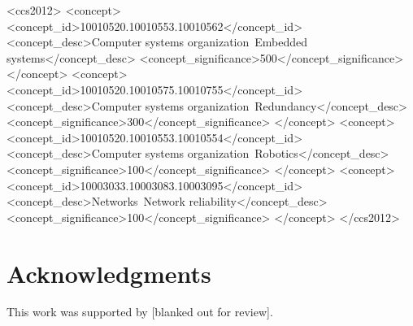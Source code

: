\documentclass[sigchi]{acmart}
\begin{document}
\renewcommand{\shortauthors}{B. Trovato et al.}



%
%
\begin{CCSXML}
<ccs2012>
 <concept>
  <concept_id>10010520.10010553.10010562</concept_id>
  <concept_desc>Computer systems organization~Embedded systems</concept_desc>
  <concept_significance>500</concept_significance>
 </concept>
 <concept>
  <concept_id>10010520.10010575.10010755</concept_id>
  <concept_desc>Computer systems organization~Redundancy</concept_desc>
  <concept_significance>300</concept_significance>
 </concept>
 <concept>
  <concept_id>10010520.10010553.10010554</concept_id>
  <concept_desc>Computer systems organization~Robotics</concept_desc>
  <concept_significance>100</concept_significance>
 </concept>
 <concept>
  <concept_id>10003033.10003083.10003095</concept_id>
  <concept_desc>Networks~Network reliability</concept_desc>
  <concept_significance>100</concept_significance>
 </concept>
</ccs2012>
\end{CCSXML}




\pagestyle{plain} %

  \maketitle

%













\section{Acknowledgments}
This work was supported by [blanked out for review].




\end{document}
